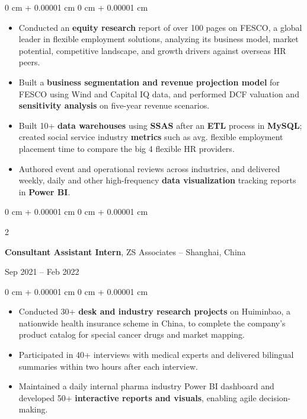 \documentclass[10pt, a4paper]{article}
\newenvironment{highlights}{
    \begin{itemize}[
        topsep=0.04 cm,
        parsep=0.02cm,
        partopsep=0pt,
        itemsep=0pt,
        leftmargin=0 cm + 10pt
    ]
}{
    \end{itemize}
} %
\newenvironment{onecolentry}{
    \begin{adjustwidth}{
        0 cm + 0.00001 cm
    }{
        0 cm + 0.00001 cm
    }
}{
    \end{adjustwidth}
} %
\newenvironment{twocolentry}[2][]{
    \onecolentry
    \def\secondColumn{#2}
    \setcolumnwidth{\fill, 4.6 cm}
    \begin{paracol}{2}
}{
    \switchcolumn \raggedleft \secondColumn
    \end{paracol}
    \endonecolentry
} %
\begin{document}
        \vspace{0.10 cm}
        \begin{onecolentry}
            \begin{highlights}
                \item Conducted an \textbf{equity research} report of over 100 pages on FESCO, a global leader in flexible employment solutions, analyzing its business model, market potential, competitive landscape, and growth drivers against overseas HR peers.
                \item Built a \textbf{business segmentation and revenue projection model} for FESCO using Wind and Capital IQ data, and performed DCF valuation and \textbf{sensitivity analysis} on five-year revenue scenarios.
                \item Built 10+ \textbf{data warehouses} using \textbf{SSAS} after an \textbf{ETL} process in \textbf{MySQL}; created social service industry \textbf{metrics} such as avg. flexible employment placement time to compare the big 4 flexible HR providers.
                \item Authored event and operational reviews across industries, and delivered weekly, daily and other high-frequency \textbf{data visualization} tracking reports in \textbf{Power BI}.
            \end{highlights}
        \end{onecolentry}

        \vspace{0.12 cm}

        \begin{twocolentry}{
            Sep 2021 – Feb 2022
        }
            \textbf{Consultant Assistant Intern}, ZS Associates -- Shanghai, China
        \end{twocolentry}

        \vspace{0.10 cm}
        \begin{onecolentry}
            \begin{highlights}
                \item Conducted 30+ \textbf{desk and industry research projects} on Huiminbao, a nationwide health insurance scheme in China, to complete the company's product catalog for special cancer drugs and market mapping.
                \item Participated in 40+ interviews with medical experts and delivered bilingual summaries within two hours after each interview.
                \item Maintained a daily internal pharma industry Power BI dashboard and developed 50+ \textbf{interactive reports and visuals}, enabling agile decision-making.
            \end{highlights}
        \end{onecolentry}
\end{document}
